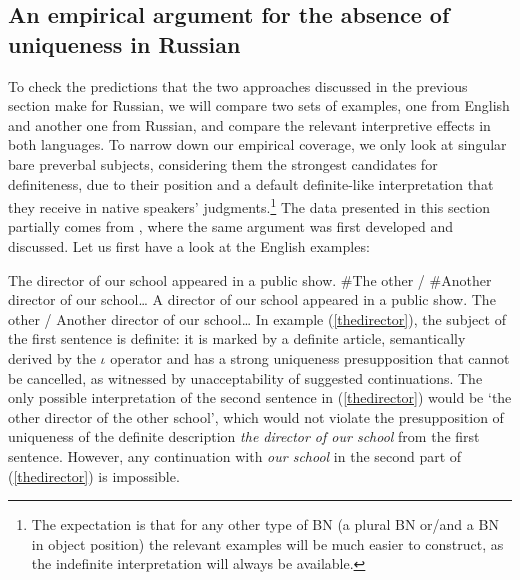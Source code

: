 \documentclass[output=paper,colorlinks,citecolor=brown]{langscibook}
\begin{document}
\subsection{An empirical argument for the absence of uniqueness in Russian} \label{absenceofuniqueness}



To check the predictions that the two approaches discussed in the previous section make for Russian, we will compare two sets of examples, one from English and another one from Russian, and compare the relevant interpretive effects in both languages. To narrow down our empirical coverage, we only look at singular bare preverbal subjects, considering them the strongest candidates for definiteness, due to their position and a default definite-like interpretation that they receive in native speakers' judgments.\footnote{The expectation is that for any other type of BN (a plural BN or/and a BN in object position) the relevant examples will be much easier to construct, as the indefinite interpretation will always be available.} The data presented in this section partially comes from \citet{seresborik21}, where the same argument was first developed and discussed. Let us first have a look at the English examples: 
 
\ea \label{thedirector}
The director of our school appeared in a public show. $\#$The other / $\#$Another director of our school{\dots}
\z
\ea \label{adirector}
A director of our school appeared in a public show. The other / Another director of our school{\dots}
\z
\noindent In example (\ref{thedirector}), the subject of the first sentence is definite: it is marked by a definite article, semantically derived by the ${\iota}$ operator and has a strong uniqueness presupposition that cannot be cancelled, as witnessed by unacceptability of suggested continuations. The only possible interpretation of the second sentence in (\ref{thedirector}) would be `the other director of the other school', which would not violate the presupposition of uniqueness of the definite description \textit{the director of our school} from the first sentence. However, any continuation with \textit{our school} in the second part of (\ref{thedirector}) is impossible. 
\end{document}
